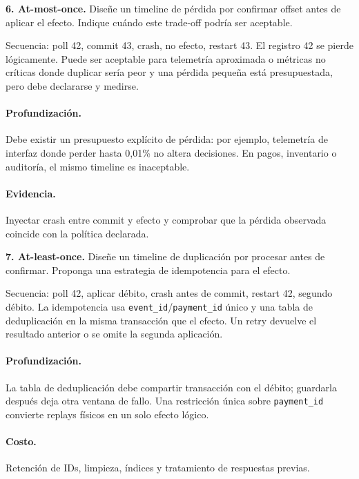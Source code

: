 \documentclass[variant=guiaresuelta,cover=institutional,mode=screen]{ua-engineering-v6-article}
\begin{document}
\begin{uaexercise}
\textbf{6. At-most-once.} Diseñe un timeline de pérdida por confirmar offset antes de aplicar el efecto. Indique cuándo este trade-off podría ser aceptable.
\end{uaexercise}
\begin{uaanswer}
Secuencia: poll 42, commit 43, crash, no efecto, restart 43. El registro 42 se pierde lógicamente. Puede ser aceptable para telemetría aproximada o métricas no críticas donde duplicar sería peor y una pérdida pequeña está presupuestada, pero debe declararse y medirse.

\paragraph{Profundización.} Debe existir un presupuesto explícito de pérdida: por ejemplo, telemetría de interfaz donde perder hasta 0,01\% no altera decisiones. En pagos, inventario o auditoría, el mismo timeline es inaceptable.\paragraph{Evidencia.} Inyectar crash entre commit y efecto y comprobar que la pérdida observada coincide con la política declarada.
\end{uaanswer}
\begin{uaexercise}
\textbf{7. At-least-once.} Diseñe un timeline de duplicación por procesar antes de confirmar. Proponga una estrategia de idempotencia para el efecto.
\end{uaexercise}
\begin{uaanswer}
Secuencia: poll 42, aplicar débito, crash antes de commit, restart 42, segundo débito. La idempotencia usa \texttt{event\_id}/\texttt{payment\_id} único y una tabla de deduplicación en la misma transacción que el efecto. Un retry devuelve el resultado anterior o se omite la segunda aplicación.

\paragraph{Profundización.} La tabla de deduplicación debe compartir transacción con el débito; guardarla después deja otra ventana de fallo. Una restricción única sobre \texttt{payment\_id} convierte replays físicos en un solo efecto lógico.\paragraph{Costo.} Retención de IDs, limpieza, índices y tratamiento de respuestas previas.
\end{uaanswer}
\end{document}

